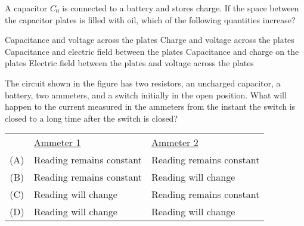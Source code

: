 \documentclass{../../oss-apphys-exam}
\begin{document}

\classkickMCinstructions

  
\begin{questions}  
%    
  
  \question A capacitor $C_0$ is connected to a battery and stores charge. If
  the space between the capacitor plates is filled with oil, which of the
  following quantities increase?
  \begin{choices}
    \choice Capacitance and voltage across the plates
    \choice Charge and voltage across the plates
    \choice Capacitance and electric field between the plates
    \choice Capacitance and charge on the plates
    \choice Electric field between the plates and voltage across the plates
  \end{choices}

  \question The circuit shown in the figure has two resistors, an uncharged
  capacitor, a battery, two ammeters, and a switch initially in the open
  position. What will happen to the current measured in the ammeters from the
  instant the switch is closed to a long time after the switch is closed?
  \begin{tabular}{cll}
    & \underline{Ammeter 1} & \underline{Ammeter 2} \\
    (A) & Reading remains constant & Reading remains constant \\
    (B) & Reading remains constant & Reading will change\\
    (C) & Reading will change      & Reading remains constant \\
    (D) & Reading will change      & Reading will change
  \end{tabular}


\end{questions}
\end{document}
